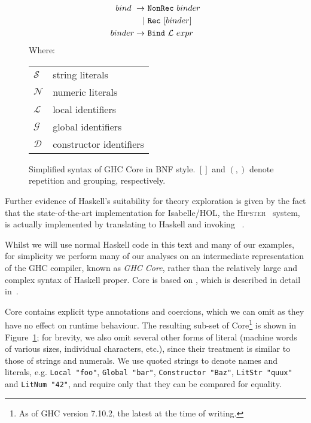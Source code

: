 \begin{figure}
\begin{equation*}
\begin{split}
      bind\    \rightarrow\ & \texttt{NonRec}\ binder                   \\
                         |\ & \texttt{Rec}\ [binder]                    \\
      binder   \rightarrow\ & \texttt{Bind}\ \mathcal{L}\ expr
    \end{split}
  \end{equation*}
  Where:
  \begin{tabular}[t]{l @{ $=$ } l}
    $\mathcal{S}$ & string literals    \\
    $\mathcal{N}$ & numeric literals   \\
    $\mathcal{L}$ & local identifiers  \\
    $\mathcal{G}$ & global identifiers \\
    $\mathcal{D}$ & constructor identifiers
  \end{tabular}

  \caption{Simplified syntax of GHC Core in BNF style. $[]$ and $(,)$ denote repetition and grouping, respectively.}
  \label{fig:coresyntax}
\end{figure}

Further evidence of Haskell's suitability for theory exploration is given by the
fact that the state-of-the-art implementation for Isabelle/HOL, the
\textsc{Hipster}~\cite{Hipster} system, is actually implemented by translating
to Haskell and invoking \hspec{}~\cite{claessen2013automating}.

Whilst we will use normal Haskell code in this text and many of our examples,
for simplicity we perform many of our analyses on an intermediate representation
of the \textsc{GHC} compiler, known as \emph{GHC Core}, rather than the
relatively large and complex syntax of Haskell proper. Core is based on \fc{},
which is described in detail in~\cite[Appendix C]{sulzmann2007system}.

Core contains explicit type annotations and coercions, which we can omit as they
have no effect on runtime behaviour. The resulting sub-set of Core\footnote{As
  of GHC version 7.10.2, the latest at the time of writing.} is shown in
Figure~\ref{fig:coresyntax}; for brevity, we also omit several other forms of
literal (machine words of various sizes, individual characters, etc.), since
their treatment is similar to those of strings and numerals. We use quoted
strings to denote names and literals, e.g. \texttt{Local "foo"},
\texttt{Global "bar"}, \texttt{Constructor "Baz"}, \texttt{LitStr "quux"} and
\texttt{LitNum "42"}, and require only that they can be compared for equality.

